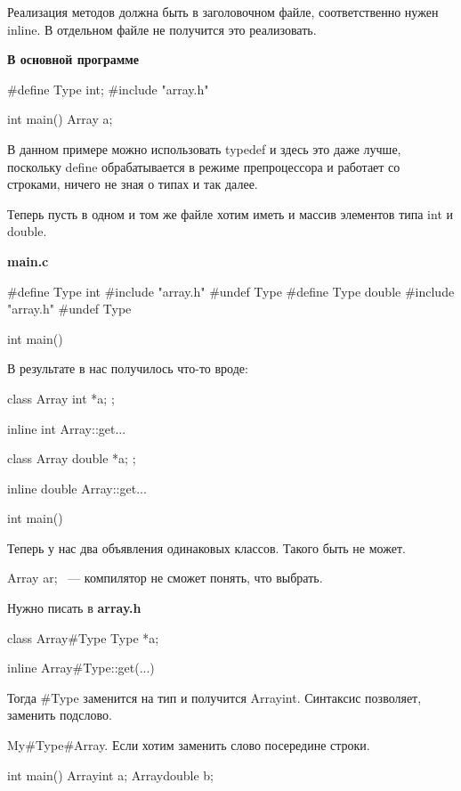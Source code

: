 Реализация методов должна быть в заголовочном файле, соответственно нужен inline. В отдельном файле не получится это реализовать.

{\bf В основной программе} 
\begin{cppcode}
#define Type int;
#include "array.h"

int main() {
    Array a;
}
\end{cppcode}
         

В данном примере можно использовать typedef и здесь это даже лучше, поскольку define обрабатывается в режиме препроцессора и работает со строками, ничего не зная о типах и так далее.

Теперь пусть в одном и том же файле хотим иметь и массив элементов типа int и double. 

{\bf main.c}
\begin{cppcode}
#define Type int
#include "array.h"
#undef Type
#define Type double
#include "array.h"
#undef Type 

int main() {
}
\end{cppcode}

В результате в нас получилось что-то вроде: 

\begin{cppcode}
class Array{
    int *a;
};

inline int Array::get...

class Array{
    double *a;
};

inline double Array::get...

int main() {
}
\end{cppcode}

Теперь у нас два объявления одинаковых классов. Такого быть не может. 

Array ar; ~--- компилятор не сможет понять, что выбрать. 

Нужно писать в {\bf array.h}
\begin{cppcode}
class Array#Type{
    Type *a;
}

inline Array#Type::get(...) {

}
\end{cppcode}

Тогда \#Type заменится на тип и получится Arrayint. Синтаксис позволяет, заменить подслово.

My\#Type\#Array. Если хотим заменить слово посередине строки.

\begin{cppcode}
int main() {
    Arrayint a;
    Arraydouble b;
}
\end{cppcode}

